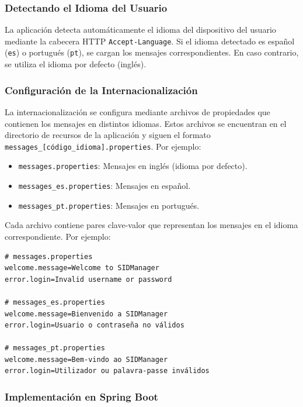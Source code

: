 \documentclass[draft]{scrbook}
\begin{document}
\subsubsection{Detectando el Idioma del Usuario}

La aplicación detecta automáticamente el idioma del dispositivo del usuario mediante la cabecera HTTP \texttt{Accept-Language}. Si el idioma detectado es español (\texttt{es}) o portugués (\texttt{pt}), se cargan los mensajes correspondientes. En caso contrario, se utiliza el idioma por defecto (inglés).

\subsubsection{Configuración de la Internacionalización}

La internacionalización se configura mediante archivos de propiedades que contienen los mensajes en distintos idiomas. Estos archivos se encuentran en el directorio de recursos de la aplicación y siguen el formato \texttt{messages\_[código\_idioma].properties}. Por ejemplo:

\begin{itemize}
    \item \texttt{messages.properties}: Mensajes en inglés (idioma por defecto).
    \item \texttt{messages\_es.properties}: Mensajes en español.
    \item \texttt{messages\_pt.properties}: Mensajes en portugués.
\end{itemize}

Cada archivo contiene pares clave-valor que representan los mensajes en el idioma correspondiente. Por ejemplo:

\begin{lstlisting}
# messages.properties
welcome.message=Welcome to SIDManager
error.login=Invalid username or password

# messages_es.properties
welcome.message=Bienvenido a SIDManager
error.login=Usuario o contraseña no válidos

# messages_pt.properties
welcome.message=Bem-vindo ao SIDManager
error.login=Utilizador ou palavra-passe inválidos
\end{lstlisting}

\subsubsection{Implementación en Spring Boot}
\end{document}
